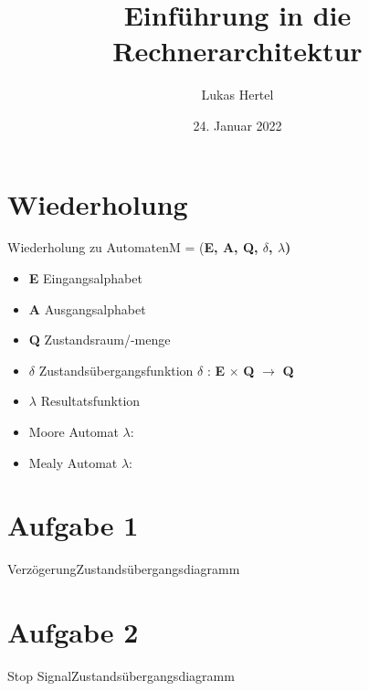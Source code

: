 \documentclass[
  german,            %
  aspectratio=169,    %
  sectionpage=false,   %
]{tumbeamer}
\title{Einführung in die Rechnerarchitektur}
\subtitle{}
\author{Lukas Hertel}
\institute{\theChairName\\\theDepartmentName\\\theUniversityName}
\date[24.01.2022]{24. Januar 2022}
\begin{document}
\maketitle

\section{Wiederholung}
\begin{frame}{Wiederholung zu Automaten}{M = (\textbf{E, A, Q, $\delta$, $\lambda$)}}
\begin{itemize}
  \item \textbf{E} Eingangsalphabet
  \item \textbf{A} Ausgangsalphabet
  \item \textbf{Q} Zustandsraum/-menge
  \item $\delta$ Zustandsübergangsfunktion $\delta$ : \textbf{E} $\times$ \textbf{Q} $\rightarrow$ \textbf{Q}
  \item $\lambda$ Resultatsfunktion
  \item Moore Automat $\lambda$:
  \item Mealy Automat $\lambda$:
\end{itemize}
\end{frame}
\section{Aufgabe 1}
\begin{frame}{Verzögerung}{Zustandsübergangsdiagramm}
  
\end{frame}
\section{Aufgabe 2}
\begin{frame}{Stop Signal}{Zustandsübergangsdiagramm}
  
\end{frame}
\end{document}
